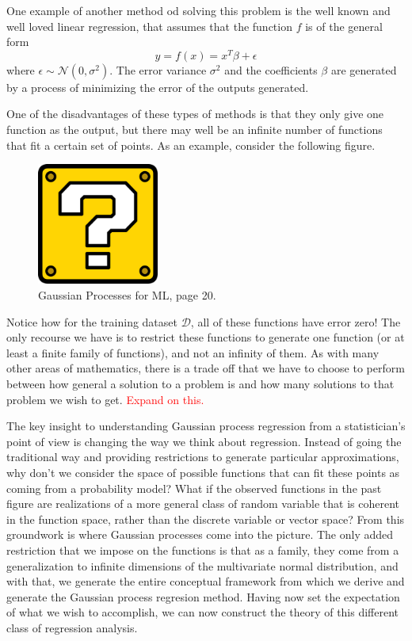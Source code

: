 One example of another method od solving this problem is the well known and well loved linear regression, that assumes that the function $f$ is of the general form 
\[ y = f(x) = x^T \beta + \epsilon \]
where $\epsilon \sim \mathcal{N}(0, \sigma^2)$. The error variance $\sigma^2$ and the coefficients $\beta$ are generated by a process of minimizing the error of the outputs generated. 

One of the disadvantages of these types of methods is that they only give one function as the output, but there may well be an infinite number of functions that fit a certain set of points. As an example, consider the following figure. 

\begin{figure}[h]
	\includegraphics[width=4cm]{Figures/missing.png}
	\centering
	\caption{Gaussian Processes for ML, page 20.}
	\label{trajectories}
\end{figure}

Notice how for the training dataset $\mathcal{D}$, all of these functions have error zero! The only recourse we have is to restrict these functions to generate one function (or at least a finite family of functions), and not an infinity of them. As with many other areas of mathematics, there is a trade off that we have to choose to perform between how general a solution to a problem is and how many solutions to that problem we wish to get. \textcolor{red}{Expand on this.} 

The key insight to understanding Gaussian process regression from a statistician's point of view is changing the way we think about regression. Instead of going the traditional way and providing restrictions to generate particular approximations, why don't we consider the space of possible functions that can fit these points as coming from a probability model? What if the observed functions in the past figure are realizations of a more general class of random variable that is coherent in the function space, rather than the discrete variable or vector space? From this groundwork is where Gaussian processes come into the picture. The only added restriction that we impose on the functions is that as a family, they come from a generalization to infinite dimensions of the multivariate normal distribution, and with that, we generate the entire conceptual framework from which we derive and generate the Gaussian process regresion method. Having now set the expectation of what we wish to accomplish, we can now construct the theory of this different class of regression analysis. 


